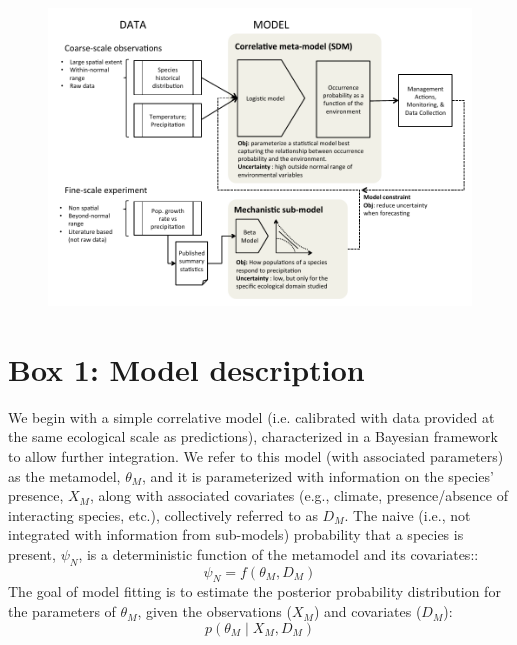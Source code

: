 \documentclass[11pt]{article}
\begin{document}
\newpage
\begin{figure}[h!]
	\includegraphics{management.pdf}
	\caption{}
	\label{fig:management}
\end{figure}


%
%


\newpage
\section*{Box 1: Model description}
We begin with a simple correlative model (i.e. calibrated with data provided at the same ecological scale as predictions), characterized in a Bayesian framework to allow further integration. 
We refer to this model (with associated parameters) as the metamodel, \(\theta_M\), and it is parameterized with information on the species' presence, \(X_M\), along with associated covariates (e.g., climate, presence/absence of interacting species, etc.), collectively referred to as \(D_M\). 
The naive (i.e., not integrated with information from sub-models) probability that a species is present, \(\psi_N\), is a deterministic function of the metamodel and its covariates::
\begin{equation}
\label{eq:sdm1}
	\psi_N = f(\theta_M, D_M)
\end{equation}
The goal of model fitting is to estimate the posterior probability distribution for the parameters of \(\theta_M\), given the observations (\(X_M\)) and covariates (\(D_M\)):
\begin{equation}
\label{eq:sdm2}
	p( \theta_M \mid X_M, D_M)
\end{equation}
\end{document}
